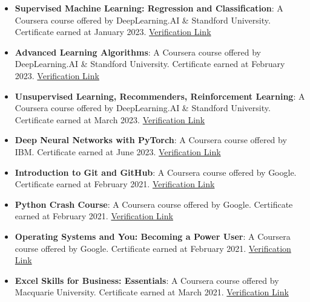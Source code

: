 \documentclass[letterpaper, 11pt]{article}
\begin{document}
\begin{itemize}[leftmargin=*]

	\item \textbf{Supervised Machine Learning: Regression and Classification}: A Coursera course offered
	      by DeepLearning.AI \& Standford University. Certificate earned at January 2023.
	      \href{https://www.coursera.org/account/accomplishments/certificate/VD8VT99H89J5}{Verification Link}

	\item \textbf{Advanced Learning Algorithms}: A  Coursera course offered by DeepLearning.AI \&
	      Standford University. Certificate earned at February 2023.
	      \href{https://www.coursera.org/account/accomplishments/certificate/7PRNGGJZ7YBR}{Verification Link}

	\item \textbf{Unsupervised Learning, Recommenders, Reinforcement Learning}: A Coursera course
	      offered by DeepLearning.AI \& Standford University. Certificate earned at March 2023.
	      \href{https://www.coursera.org/account/accomplishments/certificate/CTH6L4SBUL7S}{Verification Link}

	\item \textbf{Deep Neural Networks with PyTorch}: A Coursera course offered by IBM. Certificate
	      earned at June 2023.
	      \href{https://www.coursera.org/account/accomplishments/certificate/VW9E3WQXYPJ9}{Verification Link}

	\item \textbf{Introduction to Git and GitHub}: A Coursera course offered by Google. Certificate
	      earned at February 2021.
	      \href{https://www.coursera.org/account/accomplishments/certificate/3H3N24N688CQ}{Verification Link}

	\item \textbf{Python Crash Course}: A Coursera course offered by Google. Certificate earned at February 2021.
	      \href{https://www.coursera.org/account/accomplishments/certificate/ULTQVPQLDMZU}{Verification Link}

	\item \textbf{Operating Systems and You: Becoming a Power User}: A Coursera course offered by Google.
	      Certificate earned at February 2021.
	      \href{https://www.coursera.org/account/accomplishments/certificate/3N5CTQHU47X3}{Verification Link}

	\item \textbf{Excel Skills for Business: Essentials}: A Coursera course offered by Macquarie University.
	      Certificate earned at March 2021.
	      \href{https://www.coursera.org/account/accomplishments/certificate/7DPNK2A4CHMX}{Verification Link}

\end{itemize}
\end{document}
